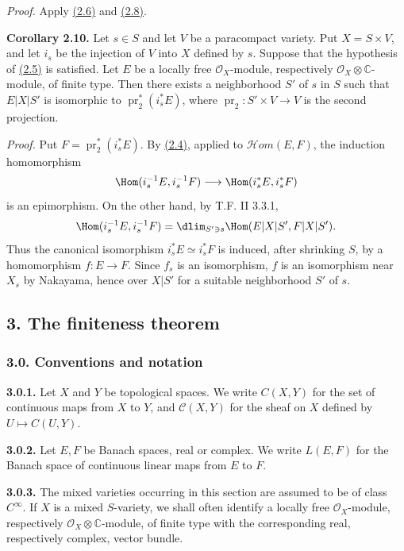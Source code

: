 \emph{Proof.} Apply \hyperlink{sga6.e02.cor.2-6}{(2.6)} and \hyperlink{sga6.e02.cor.2-8}{(2.8)}.

\textbf{Corollary 2.10.} Let $s\in S$ and let $V$ be a paracompact variety. Put $X=S\times V$, and let $i_s$ be the injection of $V$ into $X$ defined by $s$. Suppose that the hypothesis of \hyperlink{sga6.e02.cor.2-5}{(2.5)} is satisfied. Let $E$ be a locally free $\mathcal O_X$-module, respectively $\mathcal O_X\otimes\mathbb C$-module, of finite type. Then there exists a neighborhood $S'$ of $s$ in $S$ such that $E|X|S'$ is isomorphic to $\operatorname{pr}_2^*(i_s^*E)$, where $\operatorname{pr}_2:S'\times V\to V$ is the second projection.

\emph{Proof.} Put $F=\operatorname{pr}_2^*(i_s^*E)$. By \hyperlink{sga6.e02.cor.2-4}{(2.4)}, applied to $\mathcal Hom(E,F)$, the induction homomorphism
\[
 \Hom(i_s^{-1}E,i_s^{-1}F)\longrightarrow \Hom(i_s^*E,i_s^*F)
\]
is an epimorphism. On the other hand, by T.F. II 3.3.1,
\[
 \Hom(i_s^{-1}E,i_s^{-1}F)
 =\dlim_{S'\ni s}\Hom(E|X|S',F|X|S') .
\]
Thus the canonical isomorphism $i_s^*E\simeq i_s^*F$ is induced, after shrinking $S$, by a homomorphism $f:E\to F$. Since $f_s$ is an isomorphism, $f$ is an isomorphism near $X_s$ by Nakayama, hence over $X|S'$ for a suitable neighborhood $S'$ of $s$.

\subsection*{3. The finiteness theorem}

\subsubsection*{3.0. Conventions and notation}

\textbf{3.0.1.} Let $X$ and $Y$ be topological spaces. We write $C(X,Y)$ for the set of continuous maps from $X$ to $Y$, and $\mathcal C(X,Y)$ for the sheaf on $X$ defined by $U\mapsto C(U,Y)$.

\textbf{3.0.2.} Let $E,F$ be Banach spaces, real or complex. We write $L(E,F)$ for the Banach space of continuous linear maps from $E$ to $F$.

\textbf{3.0.3.} The mixed varieties occurring in this section are assumed to be of class $C^\infty$. If $X$ is a mixed $S$-variety, we shall often identify a locally free $\mathcal O_X$-module, respectively $\mathcal O_X\otimes\mathbb C$-module, of finite type with the corresponding real, respectively complex, vector bundle.

